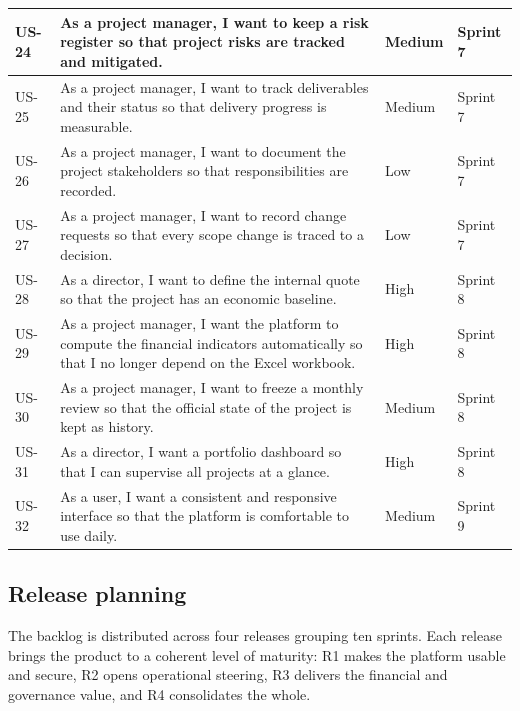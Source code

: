 \begin{longtable}{|m{1.1cm}|m{9.2cm}|m{1.9cm}|m{1.6cm}|}
\hline
US-24 & As a project manager, I want to keep a risk register so that project risks are tracked and mitigated. & Medium & Sprint 7 \\
\hline
US-25 & As a project manager, I want to track deliverables and their status so that delivery progress is measurable. & Medium & Sprint 7 \\
\hline
US-26 & As a project manager, I want to document the project stakeholders so that responsibilities are recorded. & Low & Sprint 7 \\
\hline
US-27 & As a project manager, I want to record change requests so that every scope change is traced to a decision. & Low & Sprint 7 \\
\hline
US-28 & As a director, I want to define the internal quote so that the project has an economic baseline. & High & Sprint 8 \\
\hline
US-29 & As a project manager, I want the platform to compute the financial indicators automatically so that I no longer depend on the Excel workbook. & High & Sprint 8 \\
\hline
US-30 & As a project manager, I want to freeze a monthly review so that the official state of the project is kept as history. & Medium & Sprint 8 \\
\hline
US-31 & As a director, I want a portfolio dashboard so that I can supervise all projects at a glance. & High & Sprint 8 \\
\hline
US-32 & As a user, I want a consistent and responsive interface so that the platform is comfortable to use daily. & Medium & Sprint 9 \\
\hline
\end{longtable}

\subsection{Release planning}
The backlog is distributed across four releases grouping ten sprints. Each release brings the
product to a coherent level of maturity: R1 makes the platform usable and secure, R2 opens
operational steering, R3 delivers the financial and governance value, and R4 consolidates the
whole.

